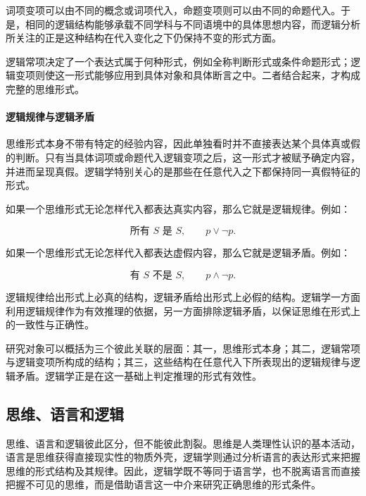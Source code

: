 词项变项可以由不同的概念或词项代入，命题变项则可以由不同的命题代入。于是，相同的逻辑结构能够承载不同学科与不同语境中的具体思想内容，而逻辑分析所关注的正是这种结构在代入变化之下仍保持不变的形式方面。

\begin{note}
逻辑常项决定了一个表达式属于何种形式，例如全称判断形式或条件命题形式；逻辑变项则使这一形式能够应用到具体对象和具体断言之中。二者结合起来，才构成完整的思维形式。
\end{note}

\paragraph{逻辑规律与逻辑矛盾}\label{logic.logical_law}\label{logic.logical_contradiction}

思维形式本身不带有特定的经验内容，因此单独看时并不直接表达某个具体真或假的判断。只有当具体词项或命题代入逻辑变项之后，这一形式才被赋予确定内容，并进而呈现真假。逻辑学特别关心的是那些在任意代入之下都保持同一真假特征的形式。

如果一个思维形式无论怎样代入都表达真实内容，那么它就是逻辑规律。例如：

\[
	\text{所有 } S \text{ 是 } S, \qquad p \lor \neg p.
\]

如果一个思维形式无论怎样代入都表达虚假内容，那么它就是逻辑矛盾。例如：

\[
	\text{有 } S \text{ 不是 } S, \qquad p \land \neg p.
\]

逻辑规律给出形式上必真的结构，逻辑矛盾给出形式上必假的结构。逻辑学一方面利用逻辑规律作为有效推理的依据，另一方面排除逻辑矛盾，以保证思维在形式上的一致性与正确性。

\begin{important}
研究对象可以概括为三个彼此关联的层面：其一，思维形式本身；其二，逻辑常项与逻辑变项所构成的结构；其三，这些结构在任意代入下所表现出的逻辑规律与逻辑矛盾。逻辑学正是在这一基础上判定推理的形式有效性。
\end{important}

\subsection{思维、语言和逻辑}

思维、语言和逻辑彼此区分，但不能彼此割裂。思维是人类理性认识的基本活动，语言是思维获得直接现实性的物质外壳，逻辑学则通过分析语言的表达形式来把握思维的形式结构及其规律。因此，逻辑学既不等同于语言学，也不脱离语言而直接把握不可见的思维，而是借助语言这一中介来研究正确思维的形式条件。

